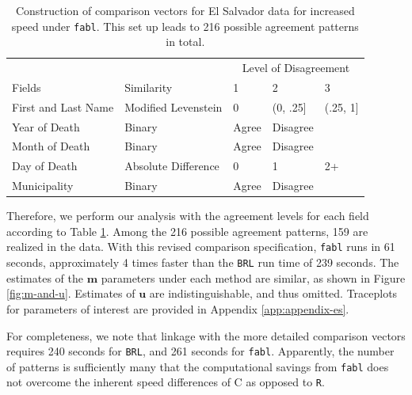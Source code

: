 \documentclass[ba]{imsart}
\begin{document}
	\begin{table}[t]
	\centering
	\begin{tabular}[t]{lllll}
		\multicolumn{2}{c}{ } & \multicolumn{3}{c}{Level of Disagreement} \\
		\cline{3-5}
		Fields & Similarity & 1 & 2 & 3\\
		\hline
		First and Last Name & Modified Levenstein & 0 & (0, .25] & (.25, 1]\\
		Year of Death & Binary & Agree & Disagree & \\
		Month of Death & Binary & Agree & Disagree & \\
		Day of Death & Absolute Difference & 0 & 1 & 2+\\
		Municipality & Binary & Agree & Disagree & \\
		\hline
	\end{tabular}
	\caption{Construction of comparison vectors for El Salvador data for increased speed under \texttt{fabl}. This set up leads to 216 possible agreement patterns in total.}\label{Tab:el_salvador_cutoffs_2}
\end{table}
	
	Therefore, we perform our analysis with the agreement levels for each field according to Table \ref{Tab:el_salvador_cutoffs_2}. Among the 216 possible agreement patterns, 159 are realized in the data. With this revised comparison specification, \texttt{fabl} runs in 61 seconds, approximately 4 times faster than the \texttt{BRL} run time of 239 seconds.  The estimates of the $\bm{m}$ parameters under each method are similar, as shown in Figure \ref{fig:m-and-u}. Estimates of $\bm{u}$ are indistinguishable, and thus omitted. Traceplots for parameters of interest are provided in Appendix \ref{app:appendix-es}.
	
	For completeness, we note that linkage with the more detailed comparison vectors requires 240 seconds for \texttt{BRL}, and 261 seconds for \texttt{fabl}.  Apparently, the number of patterns is sufficiently many that the computational savings from \texttt{fabl} does not overcome the inherent speed differences of C as opposed to \texttt{R}.
	
\end{document}
